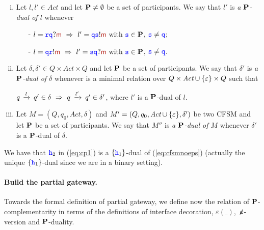 \begin{definition}\label{def:PD}%
\begin{enumerate}[i)]
\item
Let $l,l'\in\textit{Act}$ and  let $\mathbf{P}\neq\emptyset$ be a set of participants.
We say that $l'$ is {\em a $\mathbf{P}$-dual of $l$} whenever 
\begin{itemize}
\item[-]
$l = \ttr\ttq?\msg[m] \implies l'= \ttq\tts!\msg[m] \text{ with } \tts\in\roles$, ${\mathtt{\color{blue}{ {s}}}}\neq{ \ensuremath{\mathtt{\color{blue}{ {q}}}} }$;
\item[-]
$l = \ttq\ttr!\msg[m] \implies l'= \tts\ttq?\msg[m] \text{ with } \tts\in\roles$, ${\mathtt{\color{blue}{ {s}}}}\neq{ \ensuremath{\mathtt{\color{blue}{ {q}}}} }$.
\end{itemize}
\item
Let $\delta,\delta'\in Q\times\textit{Act}\times Q$ and  let $\mathbf{P}$ be a set of participants.
We say that $\delta'$ is {\em a $\mathbf{P}$-dual of $\delta$} whenever is a minimal relation over
 $Q\times\textit{Act}\cup\{\varepsilon\}\times Q$ such that\\
\centerline{
$q\,\xrightarrow{l}_{{}}\,q'\in\delta ~\Rightarrow~ q\,\xrightarrow{l'}_{{}}\,q'\in\delta'$, where $l'$ is a $\mathbf{P}$-dual of $l$.
}
\item
Let $M=(Q,q_0,\textit{Act},\delta)$ and $M'=(Q,q_0,\textit{Act}\cup\{\varepsilon\},\delta')$ be two CFSM and  let $\mathbf{P}$ be a set of participants.
We say that $M''$ is {\em a $\mathbf{P}$-dual of $M$} whenever $\delta'$ is a $\mathbf{P}$-dual of $\delta$.
\end{enumerate}
\end{definition}

We have that ${\mathtt{\color{blue}{ {h}}}}_2$ in (\ref{eq:cp1}) is a $\{{\mathtt{\color{blue}{ {h}}}}_1\}$-dual of (\ref{eq:cfsmnoeps}) (actually the
unique $\{{\mathtt{\color{blue}{ {h}}}}_1\}$-dual since we are in a binary setting).

\paragraph{Build the partial gateway.}
Towards the formal definition of partial gateway, 
we define now the relation of $\mathbf{P}$-complementarity in terms of the definitions of interface decoration,
$\varepsilon(\_)$, $\not\hspace{-1pt}\bm{\varepsilon}$-version and $\mathbf{P}$-duality.


